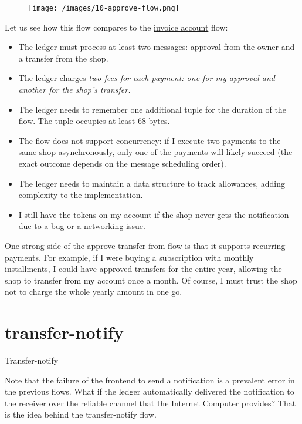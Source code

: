 \documentclass{article}
\begin{document}
\begin{figure}[grayscale-diagram]
\texttt{[image: /images/10-approve-flow.png]}
\end{figure}

Let us see how this flow compares to the \href{#invoice-account}{invoice account} flow:
\begin{itemize}
  \item The ledger must process at least two messages: approval from the owner and a transfer from the shop.
  \item The ledger charges \em{two} fees for each payment: one for my approval and another for the shop's transfer.
  \item 
    The ledger needs to remember one additional  tuple for the duration of the flow.
    The tuple occupies at least 68 bytes.
  \item 
    The flow does not support concurrency: if I execute two payments to the same shop asynchronously, only one of the payments will likely succeed (the exact outcome depends on the message scheduling order).
  \item 
    The ledger needs to maintain a data structure to track allowances, adding complexity to the implementation.
  \item 
    I still have the tokens on my account if the shop never gets the notification due to a bug or a networking issue.
\end{itemize}

One strong side of the approve-transfer-from flow is that it supports recurring payments.
For example, if I were buying a subscription with monthly installments, I could have approved transfers for the entire year, allowing the shop to transfer from my account once a month.
Of course, I must trust the shop not to charge the whole yearly amount in one go.

\section{transfer-notify}{Transfer-notify}

Note that the failure of the frontend to send a notification is a prevalent error in the previous flows.
What if the ledger automatically delivered the notification to the receiver over the reliable channel that the Internet Computer provides?
That is the idea behind the transfer-notify flow.
\end{document}
